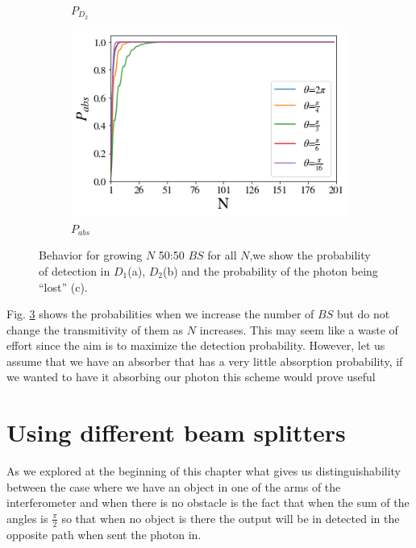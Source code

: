 \documentclass[12pt]{book}
\begin{document}
\begin{figure}[!t]
\begin{subfigure}[b]{0.45\linewidth}
\caption{$P_{D_{2}}$}
\label{fig:westminster_aerea}
\end{subfigure}
\begin{subfigure}[b]{0.45\linewidth}
\includegraphics[width=\linewidth]{images/BsFijo_azumaabs.png}
\caption{$P_{abs}$}
\label{fig:BS1}
\end{subfigure}
\caption{Behavior for growing $N$ 50:50 $BS$ for all $N$,we show the probability of detection in $D_{1}$(a), $D_{2}$(b) and the probability of the photon being ``lost'' (c).}
\label{Azuma2}
\end{figure}




 
 Fig. \ref{Azuma2} shows the probabilities when we increase the number of $BS$ but do not change the transmitivity of them as $N$ increases. This may seem like a waste of effort since the aim is to maximize the detection probability. However, let us assume that we have an absorber that has a very little absorption probability, if we wanted to have it absorbing our photon this scheme would prove useful

\section{Using different beam splitters}

As we explored at the beginning of this chapter what gives us distinguishability between the case where we have an object in one of the arms of the interferometer and when there is no obstacle is the fact that when the sum of the angles is $\frac{ \pi}{2}$ so that when no object is there the output will be in detected in the opposite path when sent the photon in.
\end{document}
